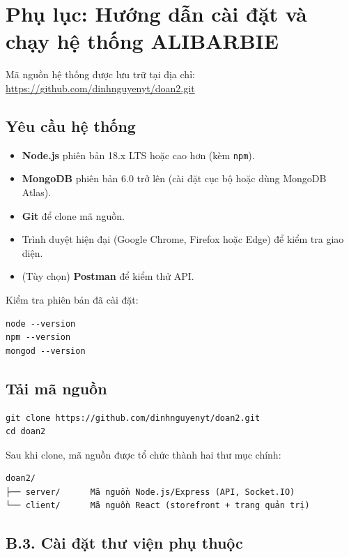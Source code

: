 \documentclass[../DoAn.tex]{subfiles}
\begin{document}
\section*{Phụ lục: Hướng dẫn cài đặt và chạy hệ thống ALIBARBIE}
\label{appendix:B}

Mã nguồn hệ thống được lưu trữ tại địa chỉ:
\url{https://github.com/dinhnguyenyt/doan2.git}

\subsection*{ Yêu cầu hệ thống}

\begin{itemize}
  \item \textbf{Node.js} phiên bản 18.x LTS hoặc cao hơn (kèm \texttt{npm}).
  \item \textbf{MongoDB} phiên bản 6.0 trở lên (cài đặt cục bộ hoặc dùng MongoDB Atlas).
  \item \textbf{Git} để clone mã nguồn.
  \item Trình duyệt hiện đại (Google Chrome, Firefox hoặc Edge) để kiểm tra giao diện.
  \item (Tùy chọn) \textbf{Postman} để kiểm thử API.
\end{itemize}

Kiểm tra phiên bản đã cài đặt:
\begin{verbatim}
node --version
npm --version
mongod --version
\end{verbatim}

\subsection*{ Tải mã nguồn}

\begin{verbatim}
git clone https://github.com/dinhnguyenyt/doan2.git
cd doan2
\end{verbatim}

Sau khi clone, mã nguồn được tổ chức thành hai thư mục chính:

\begin{verbatim}
doan2/
├── server/      Mã nguồn Node.js/Express (API, Socket.IO)
└── client/      Mã nguồn React (storefront + trang quản trị)
\end{verbatim}

\subsection*{B.3. Cài đặt thư viện phụ thuộc}
\end{document}

